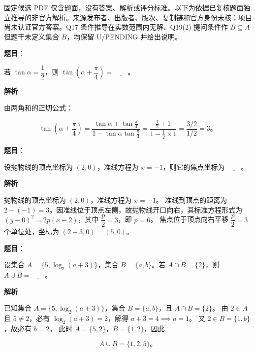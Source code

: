 

\begin{gktip}
固定候选 PDF 仅含题面，没有答案、解析或评分标准。以下为依据已复核题面独立推导的非官方解析。来源发布者、出版者、版次、复制链和官方身份未核；项目尚未认证官方答案。Q17 条件推导在实数范围内无解、Q19(2) 提问条件作 $B \subseteq A$ 但题干未定义集合 $B$，均保留 U/PENDING 并给出说明。
\end{gktip}

\begin{answer}

\textbf{题目}：

若 $\tan\alpha = \dfrac{1}{2}$，则 $\tan\left(\alpha + \dfrac{\pi}{4}\right) = \underline{\qquad}$。

\textbf{解析}

由两角和的正切公式：

\nopagebreak[4]
\[
\tan\left(\alpha + \dfrac{\pi}{4}\right) = \dfrac{\tan\alpha + \tan\frac{\pi}{4}}{1 - \tan\alpha \tan\frac{\pi}{4}} = \dfrac{\frac{1}{2} + 1}{1 - \frac{1}{2}\times 1} = \dfrac{3/2}{1/2} = 3\mbox{。}
\]


\end{answer}
\begin{answer}

\textbf{题目}：

设抛物线的顶点坐标为 $(2, 0)$，准线方程为 $x = -1$，则它的焦点坐标为 $\underline{\qquad}$。

\textbf{解析}

抛物线的顶点坐标为 $(2, 0)$，准线方程为 $x = -1$。
准线到顶点的距离为 $2 - (-1) = 3$。因准线位于顶点左侧，故抛物线开口向右，其标准方程形式为 $(y - 0)^2 = 2p(x - 2)$，其中 $\dfrac{p}{2} = 3$，即 $p = 6$。
焦点位于顶点向右平移 $\dfrac{p}{2} = 3$ 个单位处，坐标为 $(2 + 3, 0) = (5, 0)$。


\end{answer}
\begin{answer}

\textbf{题目}：

设集合 $A = \{5, \log_2(a + 3)\}$，集合 $B = \{a, b\}$。若 $A \cap B = \{2\}$，则 $A \cup B = \underline{\qquad}$。

\textbf{解析}

已知集合 $A = \{5, \log_2(a + 3)\}$，集合 $B = \{a, b\}$，且 $A \cap B = \{2\}$。
由 $2 \in A$ 且 $5 \ne 2$，必有 $\log_2(a + 3) = 2$，解得 $a + 3 = 4 \implies a = 1$。
又 $2 \in B = \{1, b\}$，故必有 $b = 2$。
此时 $A = \{5, 2\}$，$B = \{1, 2\}$，因此

\nopagebreak[4]
\[
A \cup B = \{1, 2, 5\}\mbox{。}
\]


\end{answer}
